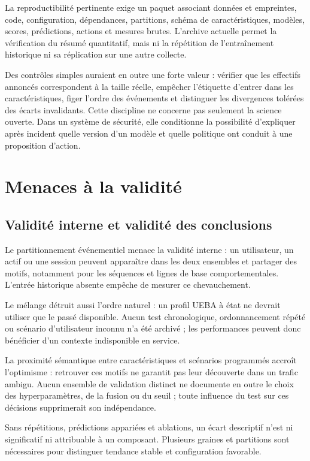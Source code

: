 \documentclass[11pt,a4paper,oneside]{report}
\theoremstyle{definition}
\theoremstyle{plain}
\begin{document}
La reproductibilité pertinente exige un paquet associant données et
empreintes, code, configuration, dépendances, partitions, schéma de
caractéristiques, modèles, scores, prédictions, actions et mesures brutes.
L'archive actuelle permet la vérification du résumé quantitatif, mais ni la
répétition de l'entraînement historique ni sa réplication sur une autre
collecte.

Des contrôles simples auraient en outre une forte valeur : vérifier que les
effectifs annoncés correspondent à la taille réelle, empêcher l'étiquette
d'entrer dans les caractéristiques, figer l'ordre des événements et distinguer
les divergences tolérées des écarts invalidants. Cette discipline ne concerne
pas seulement la science ouverte. Dans un système de sécurité, elle conditionne
la possibilité d'expliquer après incident quelle version d'un modèle et quelle
politique ont conduit à une proposition d'action.

\section{Menaces à la validité}
\label{sec:validation-validity}

\subsection{Validité interne et validité des conclusions}

Le partitionnement événementiel menace la validité interne : un utilisateur,
un actif ou une session peuvent apparaître dans les deux ensembles et partager
des motifs, notamment pour les séquences et lignes de base comportementales.
L'entrée historique absente empêche de mesurer ce chevauchement.

Le mélange détruit aussi l'ordre naturel : un profil UEBA à état ne devrait
utiliser que le passé disponible. Aucun test chronologique, ordonnancement
répété ou scénario d'utilisateur inconnu n'a été archivé ; les performances
peuvent donc bénéficier d'un contexte indisponible en service.

La proximité sémantique entre caractéristiques et scénarios programmés accroît
l'optimisme : retrouver ces motifs ne garantit pas leur découverte dans un
trafic ambigu. Aucun ensemble de validation distinct ne documente en outre le
choix des hyperparamètres, de la fusion ou du seuil ; toute influence du test
sur ces décisions supprimerait son indépendance.

Sans répétitions, prédictions appariées et ablations, un écart descriptif n'est
ni significatif ni attribuable à un composant. Plusieurs graines et partitions
sont nécessaires pour distinguer tendance stable et configuration favorable.
\end{document}

